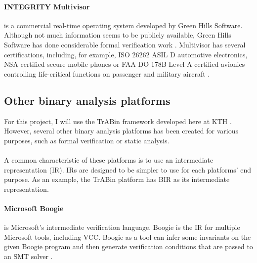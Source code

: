 \documentclass{kththesis}
\begin{document}

\paragraph{INTEGRITY Multivisor} is a commercial real-time operating system
developed by Green Hills Software. Although not much information seems to be
publicly available, Green Hills Software has done considerable formal
verification work \cite{richards_modeling_2010}. Multivisor has several
certifications, including, for example, ISO 26262 ASIL D automotive electronics,
NSA-certified secure mobile phones or FAA DO-178B Level A-certified avionics
controlling life-critical functions on passenger and military aircraft
\footnotemark.


\subsection{Other binary analysis platforms}

For this project, I will use the TrABin framework developed here at KTH
\cite{lindner_trabin:_2019}. However, several other binary analysis platforms
has been created for various purposes, such as formal verification or static
analysis.

\paragraph{} A common characteristic of these platforms is to use an
intermediate representation (IR). IRs are designed to be simpler to use for each
platforms' end purpose. As an example, the TrABin platform has BIR as its
intermediate representation.

\paragraph{Microsoft Boogie} is Microsoft's intermediate verification language.
Boogie is the IR for multiple Microsoft tools, including VCC. Boogie as a tool
can infer some invariants on the given Boogie program and then generate
verification conditions that are passed to an SMT solver \footnotemark.

\end{document}
